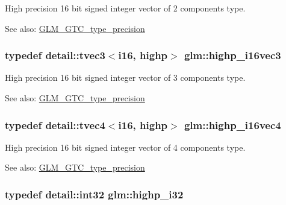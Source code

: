 High precision 16 bit signed integer vector of 2 components type. \begin{Desc}
\item[See also:]\hyperlink{group__gtc__type__precision}{GLM\_\-GTC\_\-type\_\-precision} \end{Desc}
\hypertarget{group__gtc__type__precision_g8dcfd412bd9ce99a1cf5c2b6e50f07e7}{
\subsubsection[highp\_\-i16vec3]{\setlength{\rightskip}{0pt plus 5cm}typedef detail::tvec3$<$i16, highp$>$ {\bf glm::highp\_\-i16vec3}}}
\label{group__gtc__type__precision_g8dcfd412bd9ce99a1cf5c2b6e50f07e7}


High precision 16 bit signed integer vector of 3 components type. \begin{Desc}
\item[See also:]\hyperlink{group__gtc__type__precision}{GLM\_\-GTC\_\-type\_\-precision} \end{Desc}
\hypertarget{group__gtc__type__precision_g7fd6f1b3c224833cc330a2c64b6994dd}{
\subsubsection[highp\_\-i16vec4]{\setlength{\rightskip}{0pt plus 5cm}typedef detail::tvec4$<$i16, highp$>$ {\bf glm::highp\_\-i16vec4}}}
\label{group__gtc__type__precision_g7fd6f1b3c224833cc330a2c64b6994dd}


High precision 16 bit signed integer vector of 4 components type. \begin{Desc}
\item[See also:]\hyperlink{group__gtc__type__precision}{GLM\_\-GTC\_\-type\_\-precision} \end{Desc}
\hypertarget{group__gtc__type__precision_g197d19b585222da57d70238a5cfc2be8}{
\subsubsection[highp\_\-i32]{\setlength{\rightskip}{0pt plus 5cm}typedef detail::int32 {\bf glm::highp\_\-i32}}}
\label{group__gtc__type__precision_g197d19b585222da57d70238a5cfc2be8}


